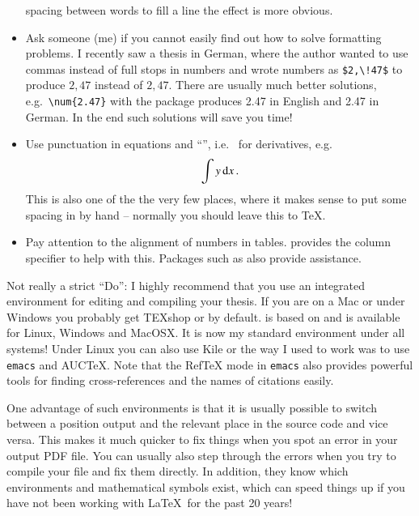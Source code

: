 \begin{itemize}
  spacing between words to fill a line the effect is more obvious.
\item Ask someone (me) if you cannot easily find out how to solve
  formatting problems. I recently saw a thesis in German, where the
  author wanted to use commas instead of full stops in numbers and
  wrote numbers as \verb+$2,\!47$+ to produce $2,\!47$ instead of
  $2,47$. There are usually much better solutions, e.g.\
  \verb+\num{2.47}+ with the  package produces
  \num{2.47} in English and \foreignlanguage{ngerman}{\num{2.47}} in
  German. In the end such solutions will save you time!
\item Use punctuation in equations and \enquote{\dif}, i.e.\  for
  derivatives,\index{derivative} e.g.
  \begin{equation*}
    \int y\, \text{d} x\,.
  \end{equation*}
  This is also one of the the very few places, where it makes sense
  to put some spacing in by hand -- normally you should leave this to \TeX.
\item Pay attention to the alignment of numbers in
  tables.  provides the  column specifier to
  help with this. Packages such as \Package{dcolumn} also provide assistance.
\end{itemize}

Not really a strict \enquote{Do}: I highly recommend that you use an
integrated environment for editing and compiling your thesis.
If you are on a Mac or under Windows you probably get TEXshop or
\TeXLive by default. 
\TeXstudio is based on \TeXmaker and is available for Linux,
Windows and MacOSX. It is now my standard environment under all systems!
Under Linux you can also use Kile\index{kile} or the way I used to work
was to use \texttt{emacs}\index{emacs} and AUCTeX.
Note that the RefTeX mode in \texttt{emacs} also provides powerful
tools for finding cross-references and the names of citations easily.

One advantage of such environments is that it is usually
possible to switch between a position output and the relevant place in
the source code and vice versa. This makes it much quicker to fix
things when you spot an error in your output PDF file. You can usually
also step through the errors when you try to compile your file and fix
them directly. In addition, they know which environments and
mathematical symbols exist, which can speed things up if you have not
been working with \LaTeX\ for the past 20 years!

